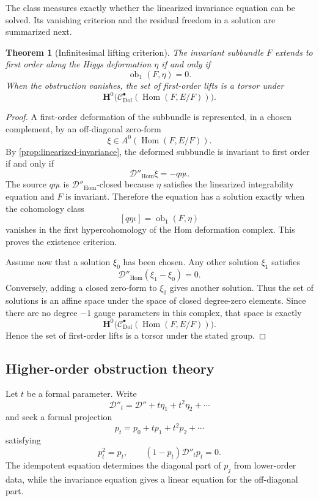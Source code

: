 \documentclass[11pt,reqno]{amsart}
\newtheorem{theorem}{Theorem}[section]
\theoremstyle{definition}
\theoremstyle{remark}
\newcommand{\cC}{\mathcal C}
\newcommand{\cD}{\mathcal D}
\newcommand{\Hom}{\operatorname{Hom}}
\newcommand{\Dol}{\mathrm{Dol}}
\begin{document}
The class measures exactly whether the linearized invariance equation can be solved.  Its vanishing criterion and the residual freedom in a solution are summarized next.

\begin{theorem}[Infinitesimal lifting criterion]\label{thm:infinitesimal-lifting}
The invariant subbundle $F$ extends to first order along the Higgs deformation $\eta$ if and only if
\[
  \operatorname{ob}_1(F,\eta)=0.
\]
When the obstruction vanishes, the set of first-order lifts is a torsor under
\[
  \mathbf H^0\bigl(\cC^\bullet_{\Dol}(\Hom(F,E/F))\bigr).
\]
\end{theorem}

\begin{proof}
A first-order deformation of the subbundle is represented, in a chosen complement, by an off-diagonal zero-form
\[
  \xi\in A^0(\Hom(F,E/F)).
\]
By \cref{prop:linearized-invariance}, the deformed subbundle is invariant to first order if and only if
\[
  \cD''_{\Hom}\xi=-q\eta\iota.
\]
The source $q\eta\iota$ is $\cD''_{\Hom}$-closed because $\eta$ satisfies the linearized integrability equation and $F$ is invariant.  Therefore the equation has a solution exactly when the cohomology class
\[
  [q\eta\iota]=\operatorname{ob}_1(F,\eta)
\]
vanishes in the first hypercohomology of the Hom deformation complex.  This proves the existence criterion.

Assume now that a solution $\xi_0$ has been chosen.  Any other solution $\xi_1$ satisfies
\[
  \cD''_{\Hom}(\xi_1-\xi_0)=0.
\]
Conversely, adding a closed zero-form to $\xi_0$ gives another solution.  Thus the set of solutions is an affine space under the space of closed degree-zero elements.  Since there are no degree $-1$ gauge parameters in this complex, that space is exactly
\[
  \mathbf H^0\bigl(\cC^\bullet_{\Dol}(\Hom(F,E/F))\bigr).
\]
Hence the set of first-order lifts is a torsor under the stated group.
\end{proof}

\subsection{Higher-order obstruction theory}

Let $t$ be a formal parameter.  Write
\[
  \cD''_t=\cD''+t\eta_1+t^2\eta_2+\cdots
\]
and seek a formal projection
\[
  p_t=p_0+tp_1+t^2p_2+\cdots
\]
satisfying
\[
  p_t^2=p_t,
  \qquad
  (1-p_t)\cD''_tp_t=0.
\]
The idempotent equation determines the diagonal part of $p_j$ from lower-order data, while the invariance equation gives a linear equation for the off-diagonal part.
\end{document}
